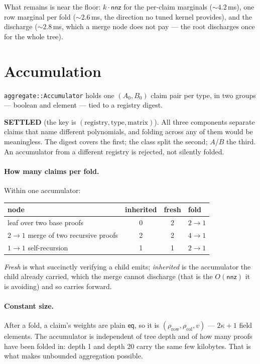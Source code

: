 \documentclass[11pt]{article}
\newcommand{\eq}{\mathsf{eq}}
\newcommand{\nnz}{\mathsf{nnz}}
\newcommand{\code}[1]{\texttt{#1}}
\newcommand{\settled}[1]{\medskip\noindent\textbf{SETTLED} (#1).\xspace}
\theoremstyle{definition}
\begin{document}
What remains is near the floor: $k\cdot\nnz$ for the per-claim marginals
(${\sim}4.2$\,ms), one row marginal per fold (${\sim}2.6$\,ms, the direction
no tuned kernel provides), and the discharge (${\sim}2.8$\,ms, which a merge
node does not pay --- the root discharges once for the whole tree).

\section{Accumulation}\label{sec:accum}

\code{aggregate::Accumulator} holds one $(A_0, B_0)$ claim pair per type,
in two groups --- boolean and element --- tied to a registry digest.

\settled{the key is $(\text{registry}, \text{type}, \text{matrix})$} All
three components separate claims that name different polynomials, and
folding across any of them would be meaningless. The digest covers the
first; the class split the second; $A$/$B$ the third. An accumulator from a
different registry is rejected, not silently folded.

\paragraph{How many claims per fold.} Within one accumulator:

\begin{center}
\begin{tabular}{lccl}
\toprule
node & inherited & fresh & fold \\
\midrule
leaf over two base proofs & 0 & 2 & $2\to1$ \\
$2\to1$ merge of two recursive proofs & 2 & 2 & $4\to1$ \\
$1\to1$ self-recursion & 1 & 1 & $2\to1$ \\
\bottomrule
\end{tabular}
\end{center}

\emph{Fresh} is what succinctly verifying a child emits; \emph{inherited} is
the accumulator the child already carried, which the merge cannot discharge
(that is the $O(\nnz)$ it is avoiding) and so carries forward.

\paragraph{Constant size.} After a fold, a claim's weights are plain $\eq$,
so it is $(\rho_{\text{row}}, \rho_{\text{col}}, v)$ --- $2\kappa+1$ field
elements. The accumulator is independent of tree depth and of how many
proofs have been folded in: depth 1 and depth 20 carry the same few
kilobytes. That is what makes unbounded aggregation possible.
\end{document}
